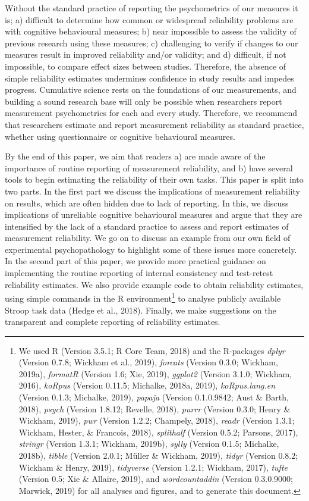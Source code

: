 \documentclass[english,,man,floatsintext]{apa6}
\let\rmarkdownfootnote\footnote%
\def\footnote{\protect\rmarkdownfootnote}
\begin{document}
Without the standard practice of reporting the psychometrics of our measures it is; a) difficult to determine how common or widespread reliability problems are with cognitive behavioural measures; b) near impossible to assess the validity of previous research using these measures; c) challenging to verify if changes to our measures result in improved reliability and/or validity; and d) difficult, if not impossible, to compare effect sizes between studies. Therefore, the absence of simple reliability estimates undermines confidence in study results and impedes progress. Cumulative science rests on the foundations of our measurements, and building a sound research base will only be possible when researchers report measurement psychometrics for each and every study. Therefore, we recommend that researchers estimate and report measurement reliability as standard practice, whether using questionnaire or cognitive behavioural measures.

By the end of this paper, we aim that readers a) are made aware of the importance of routine reporting of measurement reliability, and b) have several tools to begin estimating the reliability of their own tasks. This paper is split into two parts. In the first part we discuss the implications of measurement reliability on results, which are often hidden due to lack of reporting. In this, we discuss implications of unreliable cognitive behavioural measures and argue that they are intensified by the lack of a standard practice to assess and report estimates of measurement reliability. We go on to discuss an example from our own field of experimental psychopathology to highlight some of these issues more concretely. In the second part of this paper, we provide more practical guidance on implementing the routine reporting of internal consistency and test-retest reliability estimates. We also provide example code to obtain reliability estimates, using simple commands in the R environment\footnote{We used R (Version 3.5.1; R Core Team, 2018) and the R-packages \emph{dplyr} (Version 0.7.8; Wickham et al., 2019), \emph{forcats} (Version 0.3.0; Wickham, 2019a), \emph{formatR} (Version 1.6; Xie, 2019), \emph{ggplot2} (Version 3.1.0; Wickham, 2016), \emph{koRpus} (Version 0.11.5; Michalke, 2018a, 2019), \emph{koRpus.lang.en} (Version 0.1.3; Michalke, 2019), \emph{papaja} (Version 0.1.0.9842; Aust \& Barth, 2018), \emph{psych} (Version 1.8.12; Revelle, 2018), \emph{purrr} (Version 0.3.0; Henry \& Wickham, 2019), \emph{pwr} (Version 1.2.2; Champely, 2018), \emph{readr} (Version 1.3.1; Wickham, Hester, \& Francois, 2018), \emph{splithalf} (Version 0.5.2; Parsons, 2017), \emph{stringr} (Version 1.3.1; Wickham, 2019b), \emph{sylly} (Version 0.1.5; Michalke, 2018b), \emph{tibble} (Version 2.0.1; Müller \& Wickham, 2019), \emph{tidyr} (Version 0.8.2; Wickham \& Henry, 2019), \emph{tidyverse} (Version 1.2.1; Wickham, 2017), \emph{tufte} (Version 0.5; Xie \& Allaire, 2019), and \emph{wordcountaddin} (Version 0.3.0.9000; Marwick, 2019) for all analyses and figures, and to generate this document.} to analyse publicly available Stroop task data (Hedge et al., 2018). Finally, we make suggestions on the transparent and complete reporting of reliability estimates.
\end{document}
